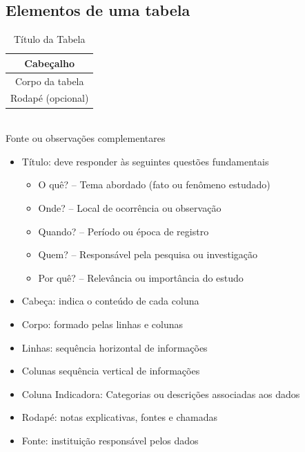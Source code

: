\documentclass[12pt]{article}
\begin{document}
    \subsection{Elementos de uma tabela}
    \begin{table}[H]
        \centering
        \caption{Título da Tabela}
        \vspace{8pt}
        \begin{tabular}{c}
            \hline
            Cabeçalho \\ \hline
            Corpo da tabela \\ \hline
            Rodapé (opcional) \\ \hline
        \end{tabular}\\
        Fonte ou observações complementares
    \end{table}
    \begin{itemize}
        \item Título: deve responder às seguintes questões fundamentais
        \begin{itemize}
            \item O quê? -- Tema abordado (fato ou fenômeno estudado)
            \item Onde? -- Local de ocorrência ou observação
            \item Quando? -- Período ou época de registro
            \item Quem? -- Responsável pela pesquisa ou investigação
            \item Por quê? -- Relevância ou importância do estudo
        \end{itemize}
        \item Cabeça: indica o conteúdo de cada coluna
        \item Corpo: formado pelas linhas e colunas
        \item Linhas: sequência horizontal de informações
        \item Colunas sequência vertical de informações
        \item Coluna Indicadora: Categorias ou descrições associadas aos dados
        \item Rodapé: notas explicativas, fontes e chamadas
        \item Fonte: instituição responsável pelos dados
    \end{itemize}
\end{document}
